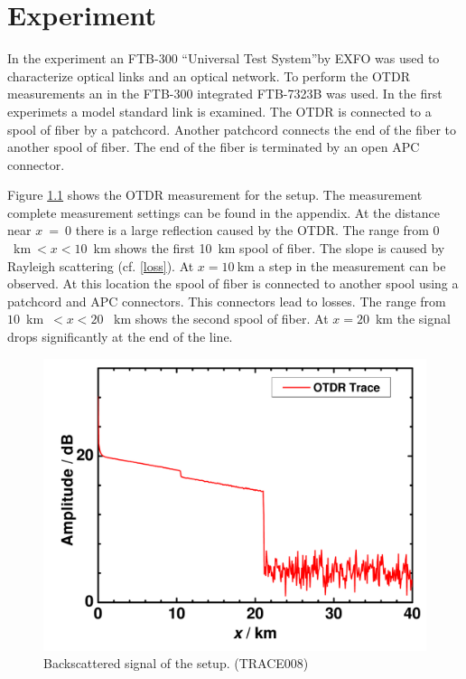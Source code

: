 \chapter{Experiment}
\label{ch:exp}
In the experiment an FTB-300 ``Universal Test System''by EXFO was used to characterize optical links and an optical network. To perform the OTDR measurements an in the FTB-300 integrated FTB-7323B was used. In the first experimets a model standard link is examined. The OTDR is connected to a spool of fiber by a patchcord. Another patchcord connects the end of the fiber to another spool of fiber. The end of the fiber is terminated by an open APC connector. 

Figure \ref{fig:1_line} shows the OTDR measurement for the setup. The measurement complete measurement settings can be found in the appendix.
At the distance near $x$~=~0 there is a large reflection caused by the OTDR. The range from $ 0$~km$~ < x < 10$~km shows the first 10~km spool of fiber. The slope is caused by Rayleigh scattering (cf. {\ref{loss}}). At $x = 10~$km a step in the measurement can be observed. At this location the spool of fiber is connected to another spool using a patchcord and APC connectors. This connectors lead to losses. 
The range from $10$~km~$ < x < 20$
~km shows the second spool of fiber. At $x = 20$~km the signal drops significantly at the end of the line.


\begin{figure}[h]%
\centering
\includegraphics[width=.6\columnwidth]{grafiken/1_line.pdf}%
\caption{Backscattered signal of the setup. (TRACE008)}%
\label{fig:1_line}%
\end{figure}
\newpage

